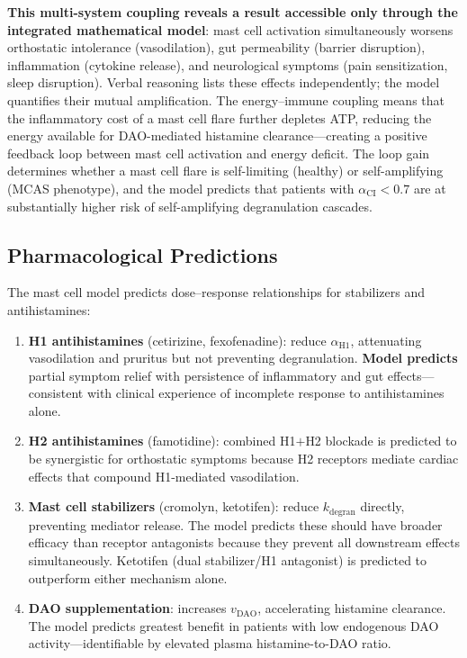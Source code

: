 \textbf{This multi-system coupling reveals a result accessible only through the integrated mathematical model}: mast cell activation simultaneously worsens orthostatic intolerance (vasodilation), gut permeability (barrier disruption), inflammation (cytokine release), and neurological symptoms (pain sensitization, sleep disruption). Verbal reasoning lists these effects independently; the model quantifies their mutual amplification. The energy--immune coupling means that the inflammatory cost of a mast cell flare further depletes ATP, reducing the energy available for DAO-mediated histamine clearance---creating a positive feedback loop between mast cell activation and energy deficit. The loop gain determines whether a mast cell flare is self-limiting (healthy) or self-amplifying (MCAS phenotype), and the model predicts that patients with $\alpha_{\text{CI}} < 0.7$ are at substantially higher risk of self-amplifying degranulation cascades.

\subsection{Pharmacological Predictions}

The mast cell model predicts dose--response relationships for stabilizers and antihistamines:

\begin{enumerate}
    \item \textbf{H1 antihistamines} (cetirizine, fexofenadine): reduce $\alpha_{\text{H1}}$, attenuating vasodilation and pruritus but not preventing degranulation. \textbf{Model predicts} partial symptom relief with persistence of inflammatory and gut effects---consistent with clinical experience of incomplete response to antihistamines alone.
    \item \textbf{H2 antihistamines} (famotidine): combined H1$+$H2 blockade is predicted to be synergistic for orthostatic symptoms because H2 receptors mediate cardiac effects that compound H1-mediated vasodilation.
    \item \textbf{Mast cell stabilizers} (cromolyn, ketotifen): reduce $k_{\text{degran}}$ directly, preventing mediator release. The model predicts these should have broader efficacy than receptor antagonists because they prevent all downstream effects simultaneously. Ketotifen (dual stabilizer/H1 antagonist) is predicted to outperform either mechanism alone.
    \item \textbf{DAO supplementation}: increases $v_{\text{DAO}}$, accelerating histamine clearance. The model predicts greatest benefit in patients with low endogenous DAO activity---identifiable by elevated plasma histamine-to-DAO ratio.
\end{enumerate}

